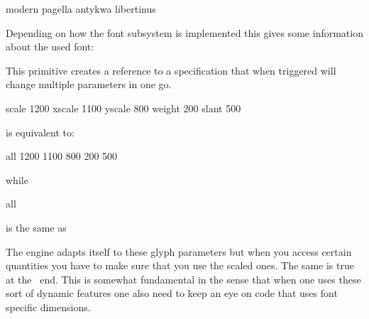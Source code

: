 \starttabulate[|l|rT|]
\NC modern     \NC \bgroup\switchtobodyfont    [modern] \NC \NR
\NC pagella    \NC \bgroup\switchtobodyfont   [pagella] \NC \NR
\NC antykwa    \NC \bgroup\switchtobodyfont   [antykwa] \NC \NR
\NC libertinus \NC \bgroup\switchtobodyfont[libertinus] \NC \NR
\stoptabulate

\stopnewprimitive

\startoldprimitive[title={\prm {fontname}}]

Depending on how the font subsystem is implemented this gives some information
about the used font:

\startbuffer
{\tf \fontname\font}
{\bf \fontname\font}
{\sl \fontname\font}
\stopbuffer

\typebuffer

\startlines
\getbuffer
\stoplines

\stopoldprimitive

\startnewprimitive[title={\prm {fontspecdef}}]

This primitive creates a reference to a specification that when triggered will
change multiple parameters in one go.

\starttyping
\fontspecdef\MyFontSpec
    \fontid\font
    scale  1200
    xscale 1100
    yscale  800
    weight  200
    slant   500
\relax
\stoptyping

is equivalent to:

\starttyping
\fontspecdef\MyFontSpec
    \fontid\font
    all 1200 1100 800 200 500
\relax
\stoptyping

while

\starttyping
\fontspecdef\MyFontSpec
    \fontid\font
    all \glyphscale \glyphxscale \glyphyscale \glyphslant \glyphweight
\relax
\stoptyping

is the same as

\starttyping
\fontspecdef\MyFontSpec
    \fontid\font
\relax
\stoptyping

The engine adapts itself to these glyph parameters but when you access certain
quantities you have to make sure that you use the scaled ones. The same is true
at the \LUA\ end. This is somewhat fundamental in the sense that when one uses
these sort of dynamic features one also need to keep an eye on code that uses
font specific dimensions.

